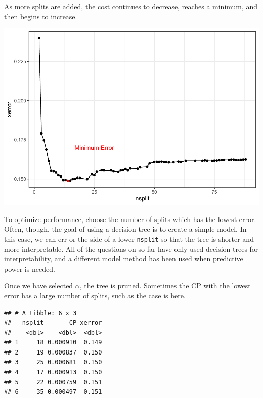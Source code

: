 \documentclass[openany]{book}
\newenvironment{Shaded}{\begin{snugshade}}{\end{snugshade}}
\newcommand{\KeywordTok}[1]{\textcolor[rgb]{0.13,0.29,0.53}{\textbf{#1}}}
\newcommand{\NormalTok}[1]{#1}
\newcommand{\OperatorTok}[1]{\textcolor[rgb]{0.81,0.36,0.00}{\textbf{#1}}}
\newcommand{\StringTok}[1]{\textcolor[rgb]{0.31,0.60,0.02}{#1}}
\begin{document}
As more splits are added, the cost continues to decrease, reaches a minimum, and then begins to increase.

\includegraphics{06-tree-based-models_files/figure-latex/unnamed-chunk-6-1.pdf}

To optimize performance, choose the number of splits which has the lowest error. Often, though, the goal of using a decision tree is to create a simple model. In this case, we can err or the side of a lower \texttt{nsplit} so that the tree is shorter and more interpretable. All of the questions on so far have only used decision trees for interpretability, and a different model method has been used when predictive power is needed.

Once we have selected \(\alpha\), the tree is pruned. Sometimes the CP with the lowest error has a large number of splits, such as the case is here.

\begin{Shaded}
\end{Shaded}

\begin{verbatim}
## # A tibble: 6 x 3
##   nsplit       CP xerror
##    <dbl>    <dbl>  <dbl>
## 1     18 0.000910  0.149
## 2     19 0.000837  0.150
## 3     25 0.000681  0.150
## 4     17 0.000913  0.150
## 5     22 0.000759  0.151
## 6     35 0.000497  0.151
\end{verbatim}
\end{document}
